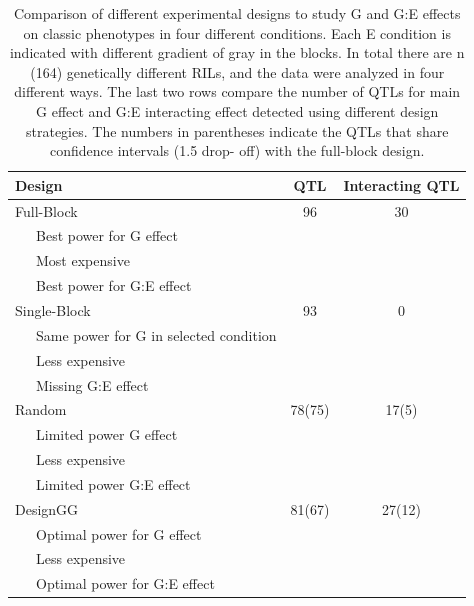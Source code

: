 \begin{table}[h!]
  \begin{center}
  {\footnotesize
  \begin{tabular}{ l  c  c }
    \hline
    {\bf Design} & {\bf QTL} & {\bf Interacting QTL}\\
    \hline
    Full-Block     & 96     & 30\\
    \ \ \ Best power for G effect & &\\
    \ \ \ Most expensive & &\\
    \ \ \ Best power for G:E effect & &\\

    Single-Block   & 93     & 0\\
    \ \ \ Same power for G in selected condition & &\\
    \ \ \ Less expensive & &\\
    \ \ \ Missing G:E effect & &\\
    Random         & 78(75) & 17(5)\\
    \ \ \ Limited power G effect & &\\
    \ \ \ Less expensive & &\\
    \ \ \ Limited power G:E effect & &\\
    DesignGG       & 81(67) & 27(12)\\
    \ \ \ Optimal power for G effect & &\\
    \ \ \ Less expensive & &\\
    \ \ \ Optimal power for G:E effect & &\\
    \hline
  \end{tabular}
  }
  \end{center}
  \caption[Comparing different experimental designs]{Comparison of different experimental designs to study G and G:E effects on classic phenotypes in four
different conditions. Each E condition is indicated with different gradient of gray in the blocks. In total
there are n (164) genetically different RILs, and the data were analyzed in four different ways. The last two
rows compare the number of QTLs for main G effect and G:E interacting effect detected using different
design strategies. The numbers in parentheses indicate the QTLs that share confidence intervals (1.5 drop-
off) with the full-block design.
}
\end{table}

